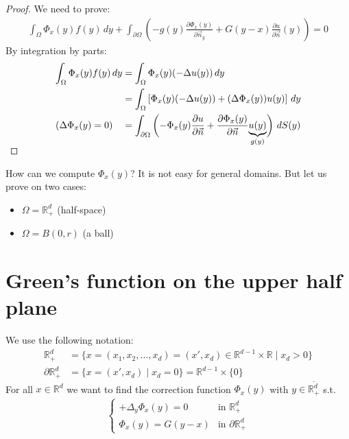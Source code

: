 \documentclass{report}
\theoremstyle{tommy}
\begin{document}
  \begin{proof}
    We need to prove: 
    \begin{align*}
      \int_\Omega \Phi_x(y) f(y) \, dy + \int_{\partial \Omega} \left(-g(y) \frac{\partial \Phi_x(y)}{\partial \vec{n}_y} + G(y-x) \frac{\partial u}{\partial \vec{n}}(y)\right) = 0
    \end{align*}
    By integration by parts:
    \begin{align*}
      \int_\Omega \Phi_x(y) f(y) \, dy 
      &= \int_\Omega \Phi_x(y) (-\Delta u(y)) \, dy  \\
      &= \int_\Omega \left[\Phi_x(y) (-\Delta u(y)) + (\Delta \Phi_x(y)) u(y)\right] \, dy \\
      (\Delta \Phi_x(y) = 0) \quad &= \int_{\partial \Omega} \left(-\Phi_x(y) \frac{\partial u}{\partial \vec{n}} + \frac{\partial \Phi_x(y)}{\partial \vec{n}} \smash{\underbrace{u(y)}_{g(y)}}\right) \, dS(y) \qedhere
    \end{align*}
  \end{proof}
  How can we compute \(\Phi_x(y)\)? It is not easy for general domains. But let us prove on two cases:
  \begin{itemize}
    \item \(\Omega = \mathbb{R}_+^d\) (half-space)
    \item \(\Omega = B(0,r)\) (a ball)
  \end{itemize}
  \section{Green's function on the upper half plane}
  We use the following notation:
  \begin{align*}
    \mathbb{R}_+^d &= \{x = (x_1, x_2, \dots, x_d) = (x', x_d) \in \mathbb{R}^{d-1} \times \mathbb{R} \mid x_d > 0\} \\
    \partial \mathbb{R}_+^d &= \{x = (x', x_d) \mid x_d = 0\} = \mathbb{R}^{d-1} \times \{0\}
  \end{align*}
  For all \(x \in \mathbb{R}^d\) we want to find the correction function \(\Phi_x(y)\) with \(y \in \overline{\mathbb{R}_{+}^d}\) s.t.
  \begin{align*}
    \begin{cases}
      + \Delta_y \Phi_x(y) = 0 & \text{in } \mathbb{R}_+^d \\ \Phi_x(y) = G(y-x) & \text{in } \partial \mathbb{R}_+^d
    \end{cases}
  \end{align*}
\end{document}
